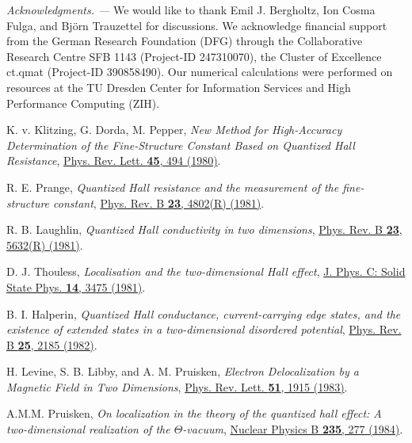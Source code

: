 \documentclass[aps,prl,amsmath,amssymb,twocolumn, superscriptaddress]{revtex4-2}
\begin{document}
{\it Acknowledgments. ---}
We would like to thank Emil J. Bergholtz, Ion Cosma Fulga, and Bj\"orn Trauzettel for discussions. We acknowledge financial support from the German Research Foundation (DFG) through the Collaborative Research Centre SFB 1143  (Project-ID 247310070), the Cluster of Excellence ct.qmat (Project-ID 390858490). Our numerical calculations were performed on resources at the TU Dresden Center for Information Services and High Performance Computing (ZIH).

\begin{thebibliography}{10}
K. v. Klitzing, G. Dorda, M. Pepper, {\em New Method for High-Accuracy Determination of the Fine-Structure Constant Based on Quantized Hall Resistance}, 
\href{https://journals.aps.org/prl/abstract/10.1103/PhysRevLett.45.494}{Phys. Rev. Lett. {\bfseries{45}}, 494 (1980)}.

R. E. Prange, {\em Quantized Hall resistance and the measurement of the fine-structure constant}, \href{https://journals.aps.org/prb/abstract/10.1103/PhysRevB.23.4802}{Phys. Rev. B {\bfseries 23}, 4802(R) (1981)}.

R. B. Laughlin, {\em Quantized Hall conductivity in two dimensions}, \href{https://journals.aps.org/prb/abstract/10.1103/PhysRevB.23.5632}{Phys. Rev. B {\bfseries 23}, 5632(R) (1981)}.

D. J. Thouless, {\em Localisation and the two-dimensional Hall effect}, \href{https://iopscience.iop.org/article/10.1088/0022-3719/14/23/022}{ J. Phys. C: Solid State Phys. {\bfseries 14}, 3475 (1981)}.

B. I. Halperin, {\em Quantized Hall conductance, current-carrying edge states, and the existence of extended states in a two-dimensional disordered potential}, \href{https://journals.aps.org/prb/abstract/10.1103/PhysRevB.25.2185}{Phys. Rev. B {\bfseries 25}, 2185 (1982)}.

H. Levine, S. B. Libby, and A. M. Pruisken, {\em Electron Delocalization by a Magnetic Field in Two Dimensions}, \href{https://journals.aps.org/prl/abstract/10.1103/PhysRevLett.51.1915}{Phys. Rev. Lett. {\bfseries 51}, 1915 (1983)}.

A.M.M. Pruisken, {\em On localization in the theory of the quantized hall effect: A two-dimensional realization of the $\Theta$-vacuum}, \href{https://www.sciencedirect.com/science/article/pii/0550321384901019}{Nuclear Physics B {\bfseries 235}, 277 (1984)}.


\end{thebibliography}
\end{document}
